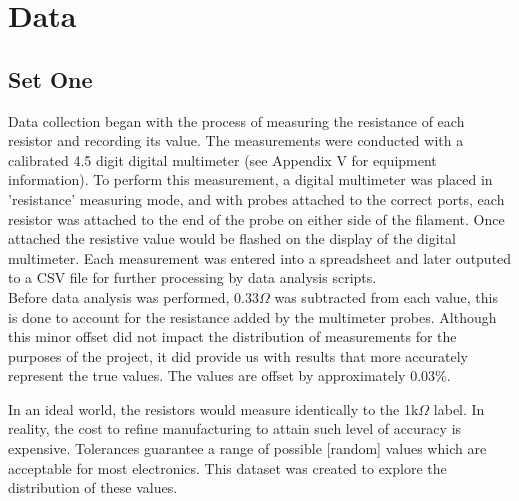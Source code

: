 \documentclass[10pt]{report}
\begin{document}
\section*{Data}

\subsection*{Set One}

Data collection began with the process of measuring the resistance of each resistor
and recording its value. The measurements were conducted with a calibrated 4.5 digit
digital multimeter (see Appendix V for equipment information). To perform this measurement,
a digital multimeter was placed in 'resistance' measuring mode, and with probes attached to the correct ports, 
each resistor was attached to the end of the probe on either side of the filament. Once attached the resistive value 
would be flashed on the display of the digital multimeter. Each measurement was entered
into a spreadsheet and later outputed to a CSV file for further processing by data analysis scripts. \\
Before data analysis was performed, $0.33\Omega$ was subtracted from each value, this is done to account
for the resistance added by the multimeter probes. Although this minor offset did not impact the
distribution of measurements for the purposes of the project, it did provide us with results that more 
accurately represent the true values. The values are offset by approximately 0.03\%.

In an ideal world, the resistors would measure identically to the 1k$\Omega$ label.
In reality, the cost to refine manufacturing to attain such level of accuracy is expensive.
Tolerances guarantee a range of possible [random] values which are acceptable for most 
electronics. This dataset was created to explore the distribution of these values.
\end{document}
